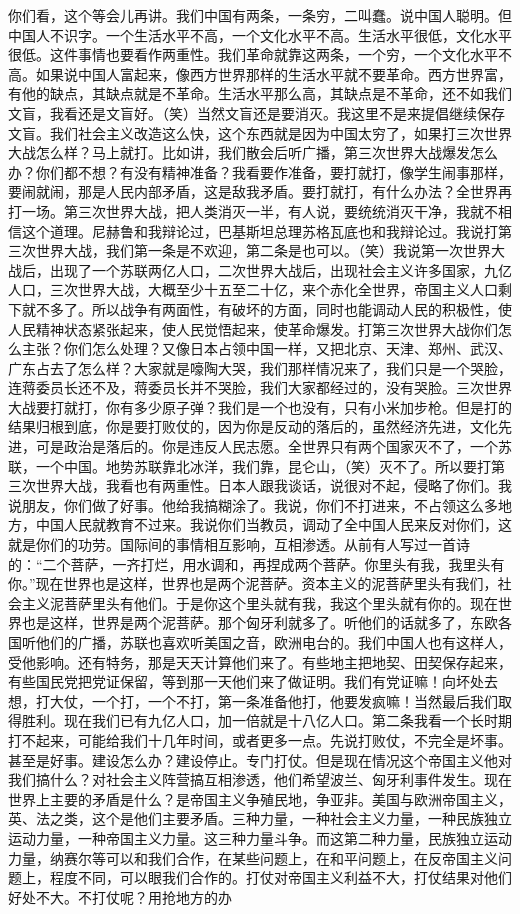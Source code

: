 你们看，这个等会儿再讲。我们中国有两条，一条穷，二叫蠢。说中国人聪明。但中国人不识字。一个生活水平不高，一个文化水平不高。生活水平很低，文化水平很低。这件事情也要看作两重性。我们革命就靠这两条，一个穷，一个文化水平不高。如果说中国人富起来，像西方世界那样的生活水平就不要革命。西方世界富，有他的缺点，其缺点就是不革命。生活水平那么高，其缺点是不革命，还不如我们文盲，我看还是文盲好。（笑）当然文盲还是要消灭。我这里不是来提倡继续保存文盲。我们社会主义改造这么快，这个东西就是因为中国太穷了，如果打三次世界大战怎么样？马上就打。比如讲，我们散会后听广播，第三次世界大战爆发怎么办？你们都不想？有没有精神准备？我看要作准备，要打就打，像学生闹事那样，要闹就闹，那是人民内部矛盾，这是敌我矛盾。要打就打，有什么办法？全世界再打一场。第三次世界大战，把人类消灭一半，有人说，要统统消灭干净，我就不相信这个道理。尼赫鲁和我辩论过，巴基斯坦总理苏格瓦底也和我辩论过。我说打第三次世界大战，我们第一条是不欢迎，第二条是也可以。（笑）我说第一次世界大战后，出现了一个苏联两亿人口，二次世界大战后，出现社会主义许多国家，九亿人口，三次世界大战，大概至少十五至二十亿，来个赤化全世界，帝国主义人口剩下就不多了。所以战争有两面性，有破坏的方面，同时也能调动人民的积极性，使人民精神状态紧张起来，使人民觉悟起来，使革命爆发。打第三次世界大战你们怎么主张？你们怎么处理？又像日本占领中国一样，又把北京、天津、郑州、武汉、广东占去了怎么样？大家就是嚎陶大哭，我们那样情况来了，我们只是一个哭脸，连蒋委员长还不及，蒋委员长并不哭脸，我们大家都经过的，没有哭脸。三次世界大战要打就打，你有多少原子弹？我们是一个也没有，只有小米加步枪。但是打的结果归根到底，你是要打败仗的，因为你是反动的落后的，虽然经济先进，文化先进，可是政治是落后的。你是违反人民志愿。全世界只有两个国家灭不了，一个苏联，一个中国。地势苏联靠北冰洋，我们靠，昆仑山，（笑）灭不了。所以要打第三次世界大战，我看也有两重性。日本人跟我谈话，说很对不起，侵略了你们。我说朋友，你们做了好事。他给我搞糊涂了。我说，你们不打进来，不占领这么多地方，中国人民就教育不过来。我说你们当教员，调动了全中国人民来反对你们，这就是你们的功劳。国际间的事情相互影响，互相渗透。从前有人写过一首诗的：“二个菩萨，一齐打烂，用水调和，再捏成两个菩萨。你里头有我，我里头有你。”现在世界也是这样，世界也是两个泥菩萨。资本主义的泥菩萨里头有我们，社会主义泥菩萨里头有他们。于是你这个里头就有我，我这个里头就有你的。现在世界也是这样，世界是两个泥菩萨。那个匈牙利就多了。听他们的话就多了，东欧各国听他们的广播，苏联也喜欢听美国之音，欧洲电台的。我们中国人也有这样人，受他影响。还有特务，那是天天计算他们来了。有些地主把地契、田契保存起来，有些国民党把党证保留，等到那一天他们来了做证明。我们有党证嘛！向坏处去想，打大仗，一个打，一个不打，第一条准备他打，他要发疯嘛！当然最后我们取得胜利。现在我们已有九亿人口，加一倍就是十八亿人口。第二条我看一个长时期打不起来，可能给我们十几年时间，或者更多一点。先说打败仗，不完全是坏事。甚至是好事。建设怎么办？建设停止。专门打仗。但是现在情况这个帝国主义他对我们搞什么？对社会主义阵营搞互相渗透，他们希望波兰、匈牙利事件发生。现在世界上主要的矛盾是什么？是帝国主义争殖民地，争亚非。美国与欧洲帝国主义，英、法之类，这个是他们主要矛盾。三种力量，一种社会主义力量，一种民族独立运动力量，一种帝国主义力量。这三种力量斗争。而这第二种力量，民族独立运动力量，纳赛尔等可以和我们合作，在某些问题上，在和平问题上，在反帝国主义问题上，程度不同，可以眼我们合作的。打仗对帝国主义利益不大，打仗结果对他们好处不大。不打仗呢？用抢地方的办